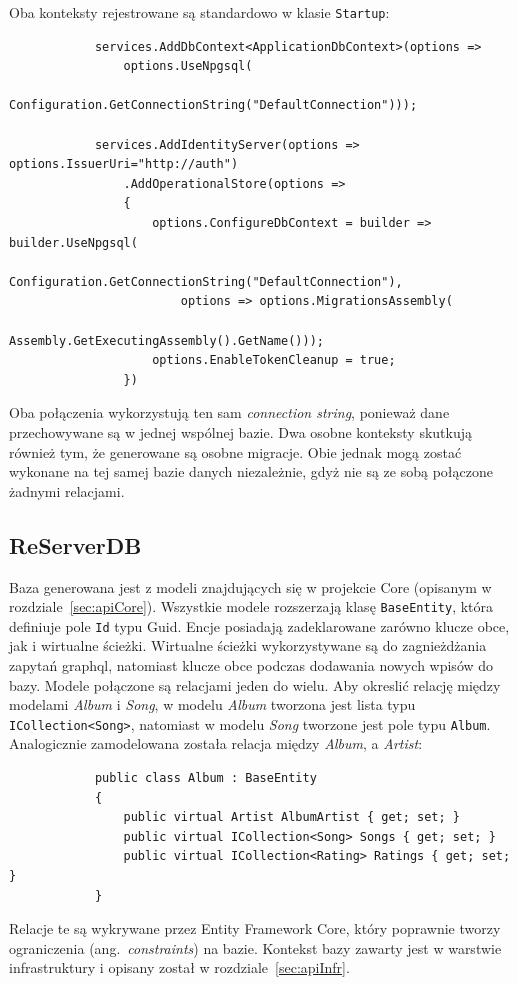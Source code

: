		Oba konteksty rejestrowane są standardowo w klasie \verb|Startup|:
		\begin{lstlisting}
			services.AddDbContext<ApplicationDbContext>(options =>
				options.UseNpgsql(
					Configuration.GetConnectionString("DefaultConnection")));

			services.AddIdentityServer(options => options.IssuerUri="http://auth")
				.AddOperationalStore(options =>
				{
					options.ConfigureDbContext = builder => builder.UseNpgsql(
						Configuration.GetConnectionString("DefaultConnection"),
						options => options.MigrationsAssembly(
							Assembly.GetExecutingAssembly().GetName()));
					options.EnableTokenCleanup = true;
				})
		\end{lstlisting}
		Oba połączenia wykorzystują ten sam \emph{connection string}, ponieważ dane przechowywane są w jednej wspólnej bazie.
		Dwa osobne konteksty skutkują również tym, że generowane są osobne migracje.
		Obie jednak mogą zostać wykonane na tej samej bazie danych niezależnie, gdyż nie są ze sobą połączone żadnymi relacjami.

	\subsection{ReServerDB}\label{sec:ReServerDB}
		Baza generowana jest z modeli znajdujących się w projekcie Core (opisanym w rozdziale~\ref{sec:apiCore}).
		Wszystkie modele rozszerzają klasę \verb|BaseEntity|, która definiuje pole \verb|Id| typu Guid.
		Encje posiadają zadeklarowane zarówno klucze obce, jak i wirtualne ścieżki.
		Wirtualne ścieżki wykorzystywane są do zagnieżdżania zapytań graphql, natomiast klucze obce podczas dodawania nowych wpisów do bazy.
		Modele połączone są relacjami jeden do wielu.
		Aby okreslić relację między modelami \emph{Album} i \emph{Song}, w modelu \emph{Album} tworzona jest lista typu \verb|ICollection<Song>|,
		natomiast w modelu \emph{Song} tworzone jest pole typu \verb|Album|.
		Analogicznie zamodelowana została relacja między \emph{Album}, a \emph{Artist}:
		\begin{lstlisting}
			public class Album : BaseEntity
			{
				public virtual Artist AlbumArtist { get; set; }
				public virtual ICollection<Song> Songs { get; set; }
				public virtual ICollection<Rating> Ratings { get; set; }
			}
		\end{lstlisting}
		Relacje te są wykrywane przez Entity Framework Core, który poprawnie tworzy ograniczenia (ang.\ \emph{constraints}) na bazie.
		Kontekst bazy zawarty jest w warstwie infrastruktury i opisany został w rozdziale~\ref{sec:apiInfr}.

